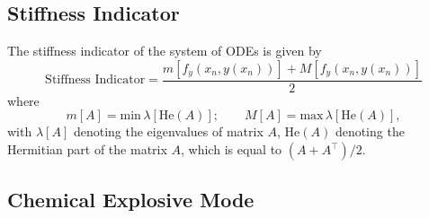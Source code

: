 \documentclass[12pt]{ussci}
\begin{document}
\subsection{Stiffness Indicator}
The stiffness indicator of the system of ODEs is given by
\begin{equation}
	\textrm{Stiffness Indicator} = \frac{m[f_y(x_n,y(x_n))] + M[f_y(x_n,y(x_n))]}{2}
\end{equation}
where
\begin{equation}
	m[A] = \textrm{min}\,\lambda[\textrm{He}(A)];\qquad M[A] = \textrm{max}\,\lambda[\textrm{He}(A)],
\end{equation}
with $\lambda [A]$ denoting the eigenvalues of matrix $A$, $\textrm{He}(A)$ denoting the Hermitian part of the matrix $A$, which is equal to $(A + A^\intercal ) / 2$.



\subsection{Chemical Explosive Mode}
\end{document}
